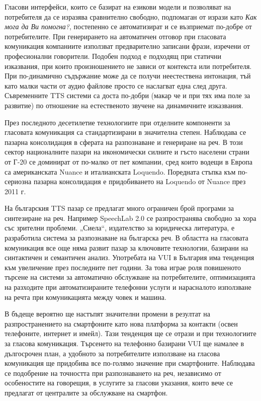 \begin{multicols}{2}
Гласови интерфейси, които се базират на езикови модели и позволяват на потребителя да се изразява сравнително свободно, подпомаган от изрази като \textit{Как мога да Ви помогна?}, постепенно се автоматизират и се възприемат по-добре от потребителите.
При генерирането на автоматичен отговор при гласовата комуникация компаниите използват предварително записани фрази, изречени от професионални говорители. Подобен подход е подходящ при статични изказвания, при които произношението не зависи от контекста или потребителя. При по-динамично съдържание може да се получи неестествена интонация, тъй като  малки части от аудио файлове просто се наслагват една след друга. Съвременните TTS системи са доста по-добри (макар че и при тях  има поле за развитие) по отношение на естественото звучене 
 на динамичните изказвания.

През последното десетилетие технологиите при отделните компоненти за гласовата комуникация са стандартизирани в значителна степен. Наблюдава се пазарна консолидация в сферата на разпознаване и генериране на реч. В този сектор националните пазари на икономически силните и гъсто населени страни от Г-20 се доминират от по-малко от пет компании, сред които водещи в Европа са американската Nuance и италианската Loquendo. Поредната стъпка към по-сериозна пазарна консолидация  е придобиването на Loquendo от Nuance през 2011 г.

На българския TTS пазар се предлагат много ограничен брой програми за синтезиране на реч. Например SpeechLab 2.0 се разпространява свободно за хора със зрителни проблеми. „Сиела“, издателство за юридическа литература, е разработила система за разпознаване на българска реч. В областта на  гласовата комуникация все още няма развит пазар за ключовите технологии, базирани на синтактичен и семантичен анализ.
Употребата на VUI в България има тенденция към увеличение през последните пет години. За това играе роля повишеното търсене на системи за автоматично
 обслужване на потребителите, оптимизацията на
 разходите при автоматизираните телефонни услуги и
 нарасналото използване на речта при комуникацията между човек и
машина.

В бъдеще вероятно ще настъпят значителни промени в
 резултат на разпространението на смартфоните като
 нова платформа за контакти (освен телефоните, интернет и имейл).
Тази тенденция ще се отрази и при технологиите за
 гласова комуникация. Търсенето на
 телефонно базирани VUI ще намалее в дългосрочен
 план, а удобното за потребителите използване на гласова комуникация ще придобива все по-голямо значение при смартфоните. Наблюдава се подобрение на
 точността при разпознаването на реч, независимо от особеностите на
 говорещия, в услугите за гласови указания, които вече се предлагат от централите за обслужване на смартфон.



\end{multicols}
